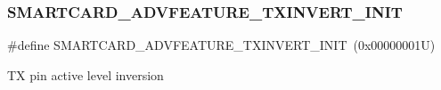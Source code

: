 \subsubsection{\texorpdfstring{S\+M\+A\+R\+T\+C\+A\+R\+D\+\_\+\+A\+D\+V\+F\+E\+A\+T\+U\+R\+E\+\_\+\+T\+X\+I\+N\+V\+E\+R\+T\+\_\+\+I\+N\+IT}{SMARTCARD\_ADVFEATURE\_TXINVERT\_INIT}}
{\footnotesize\ttfamily \#define S\+M\+A\+R\+T\+C\+A\+R\+D\+\_\+\+A\+D\+V\+F\+E\+A\+T\+U\+R\+E\+\_\+\+T\+X\+I\+N\+V\+E\+R\+T\+\_\+\+I\+N\+IT~(0x00000001\+U)}

TX pin active level inversion 